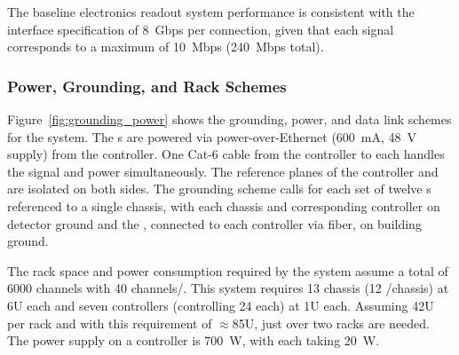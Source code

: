 The baseline electronics readout system performance is consistent with the  interface specification of 8~Gbps per connection, given that  
each  signal corresponds to a maximum of 10~Mbps (240~Mbps total).  



\subsubsection{Power, Grounding, and Rack Schemes} 

Figure~\ref{fig:grounding_power} shows the grounding, power, and data link schemes for the system. The s are powered via power-over-Ethernet (\SI{600}{mA}, \SI{48}{V} supply) from the controller. One Cat-6 cable from the controller to each  handles the signal and power simultaneously. The reference planes of the controller and  are isolated on both sides. The grounding scheme calls for each set of twelve s referenced to a single chassis, with each chassis and corresponding controller on detector ground and the , connected to each controller via fiber, on building ground. 
 
The rack space and power consumption required by the system assume
a total of 6000 channels with 40 channels/. This system requires 13 chassis (12 /chassis) at 6U each and seven controllers (controlling 24  each) at 1U each. Assuming 42U per rack and with this requirement of $\approx$85U, just over two racks are needed. The power supply on a controller is 700~W, with each  taking 20~W. 
 

